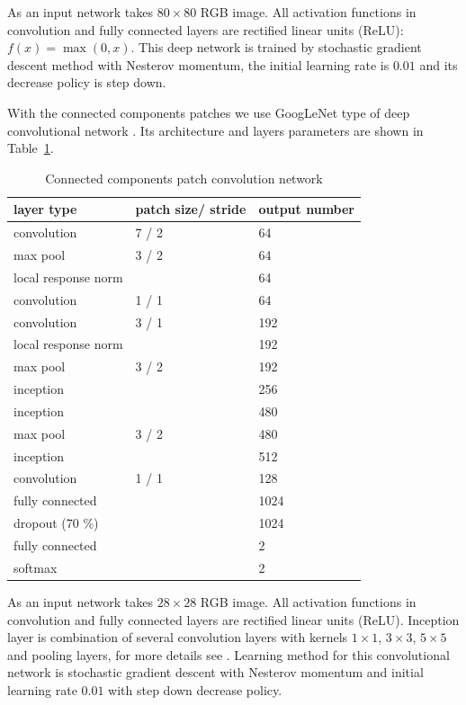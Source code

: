 \documentclass[conference,a4paper]{ieeetran}
\begin{document}

As an input network takes $80\times80$ RGB image. All activation functions in convolution and fully connected layers are rectified linear units (ReLU): $f(x)=\max(0, x)$. This deep network is trained by stochastic gradient descent method with Nesterov momentum, the initial learning rate is $0.01$ and its decrease policy is step down. 

With the connected components patches we use GoogLeNet type of deep convolutional network \cite{Googlenet}. Its architecture and layers parameters are shown in Table~\ref{googlenet_tab}.
\begin{table}[!t]
\centering
\caption{Connected components patch convolution network}
\label{googlenet_tab}
\begin{tabular}{|l|p{1.3cm}|p{1.3cm}|}
\hline
\textbf{layer type} & \textbf{patch size/ stride} & \textbf{output number}  \\
\hline
convolution & 7 / 2 & 64 \\
\hline
max pool & 3 / 2 & 64 \\
\hline
local response norm & & 64 \\
\hline
convolution & 1 / 1 & 64 \\
\hline
convolution & 3 / 1 & 192 \\
\hline
local response norm & & 192 \\
\hline
max pool & 3 / 2 & 192 \\
\hline
inception &  & 256 \\
\hline
inception &  & 480 \\
\hline
max pool & 3 / 2 & 480 \\
\hline
inception &  & 512 \\
\hline
convolution & 1 / 1 & 128 \\
\hline
fully connected & & 1024 \\
\hline
dropout (70 \%) & & 1024 \\
\hline
fully connected & & 2 \\
\hline
softmax & & 2 \\
\hline
\end{tabular}
\end{table}		

As an input network takes $28\times28$ RGB image. All activation functions in convolution and fully connected layers are rectified linear units (ReLU). Inception layer is combination of several convolution layers with kernels $1\times1$, $3\times3$, $5\times5$ and pooling layers, for more details see \cite{Googlenet}. Learning method for this convolutional network is stochastic gradient descent with Nesterov momentum and initial learning rate $0.01$ with step down decrease policy.
\end{document}
